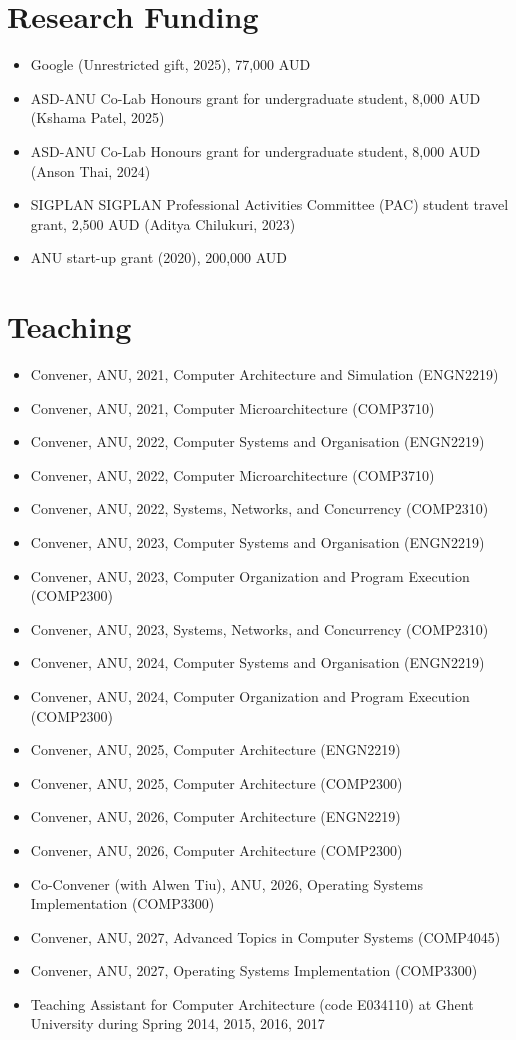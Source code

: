 \documentclass[singlecolumn,singlespace,11pt,a4paper]{article}
\begin{document}
\section*{Research Funding}
\begin{itemize}
\item Google (Unrestricted gift, 2025), 77,000 AUD
\item ASD-ANU Co-Lab Honours grant for undergraduate student, 8,000 AUD (Kshama Patel, 2025) 
\item ASD-ANU Co-Lab Honours grant for undergraduate student, 8,000 AUD (Anson Thai, 2024)
\item SIGPLAN SIGPLAN Professional Activities Committee (PAC) student travel grant, 2,500 AUD (Aditya Chilukuri, 2023)
\item ANU start-up grant (2020), 200,000 AUD
\end{itemize}

\section*{Teaching}
\begin{itemize}
\item Convener, ANU, 2021, Computer Architecture and Simulation (ENGN2219)
\item Convener, ANU, 2021, Computer Microarchitecture (COMP3710) 
\item Convener, ANU, 2022, Computer Systems and Organisation (ENGN2219)
\item Convener, ANU, 2022, Computer Microarchitecture (COMP3710) 
\item Convener, ANU, 2022, Systems, Networks, and Concurrency (COMP2310) 
\item Convener, ANU, 2023, Computer Systems and Organisation (ENGN2219) 
\item Convener, ANU, 2023, Computer Organization and Program Execution (COMP2300) 
\item Convener, ANU, 2023, Systems, Networks, and Concurrency (COMP2310) 
\item Convener, ANU, 2024, Computer Systems and Organisation (ENGN2219) 
\item Convener, ANU, 2024, Computer Organization and Program Execution (COMP2300)
\item Convener, ANU, 2025, Computer Architecture (ENGN2219) 
\item Convener, ANU, 2025, Computer Architecture (COMP2300)
\item Convener, ANU, 2026, Computer Architecture (ENGN2219) 
\item Convener, ANU, 2026, Computer Architecture (COMP2300)
\item Co-Convener (with Alwen Tiu), ANU, 2026, Operating Systems Implementation (COMP3300)
\item Convener, ANU, 2027, Advanced Topics in Computer Systems (COMP4045)
\item Convener, ANU, 2027, Operating Systems Implementation (COMP3300)
\item Teaching Assistant for Computer Architecture (code E034110) at Ghent University during Spring 2014, 2015, 2016, 2017
\end{itemize}
\end{document}
